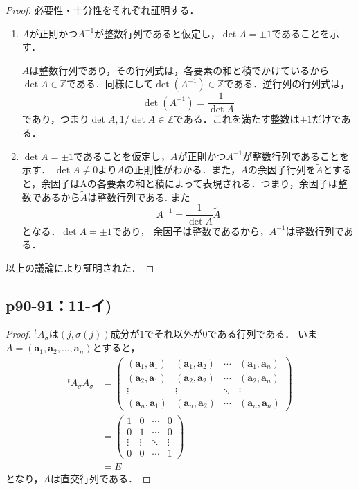 \documentclass[uplatex,dvipdfmx,a4paper,11pt,fleqn]{jsarticle}
\begin{document}
\begin{leftbar}
\begin{proof}
必要性・十分性をそれぞれ証明する．
\begin{enumerate}
\item $A$が正則かつ$A^{-1}$が整数行列であると仮定し，$\det A=\pm 1$であることを示す．

$A$は整数行列であり，その行列式は，各要素の和と積でかけているから$\det A \in \mathbb{Z}$である．同様にして$\det (A^{-1}) \in \mathbb{Z}$である．逆行列の行列式は，
\[
\det (A^{-1})=\frac{1}{\det A}
\]
であり，つまり$\det A,1/\det A \in \mathbb{Z}$である．これを満たす整数は$\pm 1$だけである．
\item $\det A=\pm 1$であることを仮定し，$A$が正則かつ$A^{-1}$が整数行列であることを示す．
$\det A \neq 0$より$A$の正則性がわかる．また，$A$の余因子行列を$\tilde{A}$とすると，余因子はAの各要素の和と積によって表現される．つまり，余因子は整数であるから$\tilde{A}$は整数行列である. また
\[
A^{-1}=\frac{1}{\det A}\tilde{A}
\]
となる．$\det A=\pm 1$であり， 余因子は整数であるから，$A^{-1}$は整数行列である．
\end{enumerate}
以上の議論により証明された．
\end{proof}
\end{leftbar}

\newpage 

\subsection*{p90-91：11-イ)}
\begin{tleftbar}
    \begin{proof}
     ${}^t A_\sigma$は$(j,\sigma(j))$成分が$1$でそれ以外が$0$である行列である．
        いま$A = (\bm{a}_1,\bm{a}_2,\ldots,\bm{a}_n)$とすると，
        \begin{align*}
            {}^t A_\sigma A_\sigma &= 
            \begin{pmatrix} 
                (\bm{a}_1,\bm{a}_1) & (\bm{a}_1,\bm{a}_2) & \cdots & (\bm{a}_1,\bm{a}_n) \\ 
                (\bm{a}_2,\bm{a}_1) & (\bm{a}_2,\bm{a}_2) & \cdots & (\bm{a}_2,\bm{a}_n) \\
                \vdots & \vdots & \ddots & \vdots \\
                (\bm{a}_n,\bm{a}_1) & (\bm{a}_n,\bm{a}_2) & \cdots & (\bm{a}_n,\bm{a}_n)
            \end{pmatrix}
            \\
            & = \begin{pmatrix} 1 & 0 & \cdots & 0 \\ 0 & 1 & \cdots & 0 \\ \vdots & \vdots & \ddots & \vdots \\ 0 & 0 & \cdots & 1 \end{pmatrix} \\
            &= E
        \end{align*}
        となり，$A$は直交行列である．
    \end{proof}
\end{tleftbar}
\end{document}
